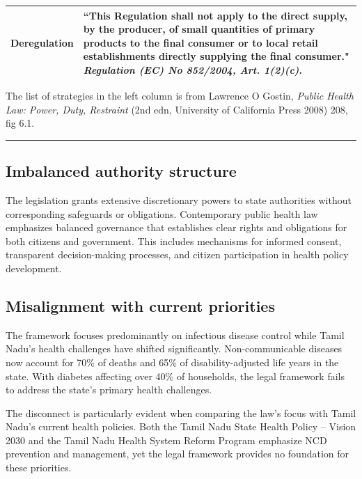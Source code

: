 \documentclass[a4paper,11pt]{article}
\newenvironment{floatsource}{\medskip}{\smallskip\hrule}
\begin{document}
\begin{table}[htbp]
\begin{center}
\begin{tabular}{@{}p{4cm}p{8cm}@{}}
        Deregulation & ``This Regulation shall not apply to the direct supply, by the producer, of small quantities of primary products to the final consumer or to local retail establishments directly supplying the final consumer."  \textit{Regulation (EC) No 852/2004, Art. 1(2)(c)}. \\
        \bottomrule
        \end{tabular}
        \end{center}

        \begin{floatsource}
        The list of strategies in the left column is from Lawrence O Gostin, \textit{Public Health Law: Power, Duty, Restraint} (2nd edn, University of California Press 2008) 208, fig 6.1.
        \end{floatsource}
        \end{table}
    \subsection{Imbalanced authority structure} 
    
    The legislation grants extensive discretionary powers to state authorities without corresponding safeguards or obligations. Contemporary public health law emphasizes balanced governance that establishes clear rights and obligations for both citizens and government. This includes mechanisms for informed consent, transparent decision-making processes, and citizen participation in health policy development.

    \subsection{Misalignment with current priorities} 
    
    The framework focuses predominantly on infectious disease control while Tamil Nadu's health challenges have shifted significantly. Non-communicable diseases now account for 70\% of deaths and 65\% of disability-adjusted life years in the state. With diabetes affecting over 40\% of households, the legal framework fails to address the state's primary health challenges.
    
    The disconnect is particularly evident when comparing the law's focus with Tamil Nadu's current health policies. Both the Tamil Nadu State Health Policy – Vision 2030 and the Tamil Nadu Health System Reform Program emphasize NCD prevention and management, yet the legal framework provides no foundation for these priorities.
\end{document}
